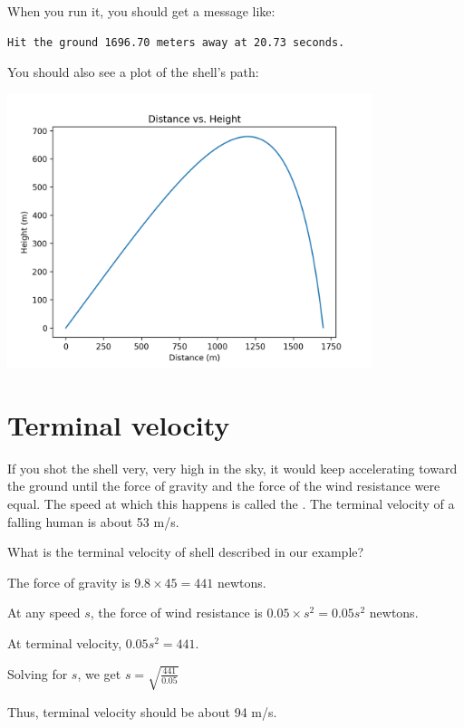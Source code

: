 When you run it, you should get a message like:
\begin{Verbatim}
Hit the ground 1696.70 meters away at 20.73 seconds.
\end{Verbatim}

You should also see a plot of the shell's path:

\includegraphics[width=0.8\textwidth]{artillery.png}

\section{Terminal velocity}

If you shot the shell very, very high in the sky, it would keep accelerating 
toward the ground until the force of gravity and the force of the wind resistance were equal.
The speed at which this happens is called the .  The terminal velocity of a
falling human is about 53 m/s.

\begin{Exercise}[title={Terminal velocity}, label=terminal_velocity]
    What is the terminal velocity of shell described in our example?
\end{Exercise}
\begin{Answer}[ref=terminal_velocity]
The force of gravity is $9.8 \times 45 = 441$ newtons.

At any speed $s$, the force of wind resistance is $0.05 \times s^2 = 0.05 s^2$ newtons.

At terminal velocity, $0.05 s^2 = 441$. 

Solving for $s$, we get $s = \sqrt{\frac{441}{0.05}}$

Thus, terminal velocity should be about 94 m/s.

\end{Answer}
